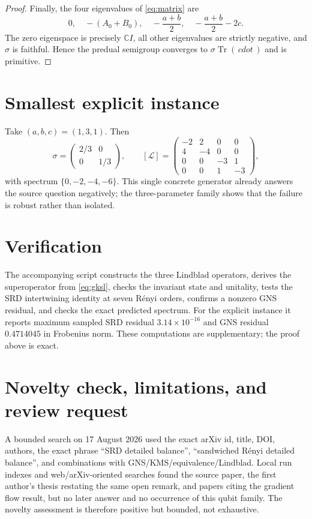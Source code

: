 \documentclass[10pt]{article}
\newcommand{\Tr}{\operatorname{Tr}}
\newcommand{\cL}{\mathcal L}
\begin{document}
\begin{proof}
Finally, the four eigenvalues of \eqref{eq:matrix} are
\[
 0,\quad -(A_0+B_0),\quad -\frac{a+b}{2},\quad
 -\frac{a+b}{2}-2c.
\]
The zero eigenspace is precisely $\mathbb C I$, all other eigenvalues are
strictly negative, and $\sigma$ is faithful.  Hence the predual semigroup
converges to $\sigma\Tr(\,cdot\,)$ and is primitive.
\end{proof}

\section*{Smallest explicit instance}

Take $(a,b,c)=(1,3,1)$.  Then
\[
 \sigma=\begin{pmatrix}2/3&0\\0&1/3\end{pmatrix},\qquad
 [\cL]=
 \begin{pmatrix}
 -2&2&0&0\\4&-4&0&0\\0&0&-3&1\\0&0&1&-3
 \end{pmatrix},
\]
with spectrum $\{0,-2,-4,-6\}$.  This single concrete generator already
answers the source question negatively; the three-parameter family shows that
the failure is robust rather than isolated.

\section*{Verification}

The accompanying script constructs the three Lindblad operators, derives the
superoperator from \eqref{eq:gksl}, checks the invariant state and unitality,
tests the SRD intertwining identity at seven R\'enyi orders, confirms a nonzero
GNS residual, and checks the exact predicted spectrum.  For the explicit
instance it reports maximum sampled SRD residual
$3.14\times10^{-16}$ and GNS residual $0.4714045$ in Frobenius norm.  These
computations are supplementary; the proof above is exact.

\section*{Novelty check, limitations, and review request}

A bounded search on 17 August 2026 used the exact arXiv id, title, DOI, authors,
the exact phrase ``SRD detailed balance'', ``sandwiched R\'enyi detailed
balance'', and combinations with GNS/KMS/equivalence/Lindblad.  Local run
indexes and web/arXiv-oriented searches found the source paper, the first
author's thesis restating the same open remark, and papers citing the gradient
flow result, but no later answer and no occurrence of this qubit family.  The
novelty assessment is therefore positive but bounded, not exhaustive.
\end{document}
